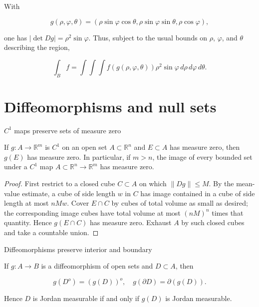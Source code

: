 \begin{example}

With

\[g\left( {\rho,\varphi,\theta} \right) = \left( {\rho\sin\varphi\cos\theta,\rho\sin\varphi\sin\theta,\rho\cos\varphi} \right),\]

one has \(\left| {\det Dg} \right| = \rho^{2}\sin\varphi\). Thus, subject to the usual bounds on \(\rho\), \(\varphi\), and \(\theta\) describing the region,

\[\int_{B}f = \int\int\int f\left( {g\left( {\rho,\varphi,\theta} \right)} \right)\rho^{2}\sin\varphi\, d\rho\, d\varphi\, d\theta.\]

\end{example}

\section{Diffeomorphisms and null sets}

\begin{theorem}{\(C^{1}\) maps preserve sets of measure zero}

If \(g:A\rightarrow\mathbb{R}^{m}\) is \(C^{1}\) on an open set \(A \subset \mathbb{R}^{n}\) and \(E \subset A\) has measure zero, then \(g(E)\) has measure zero. In particular, if \(m > n\), the image of every bounded set under a \(C^{1}\) map \(A \subset \mathbb{R}^{n}\rightarrow\mathbb{R}^{m}\) has measure zero.

\end{theorem}

\begin{proof}

First restrict to a closed cube \(C \subset A\) on which \(\left\| {Dg} \right\| \leq M\). By the mean-value estimate, a cube of side length \(w\) in \(C\) has image contained in a cube of side length at most \(nMw\). Cover \(E \cap C\) by cubes of total volume as small as desired; the corresponding image cubes have total volume at most \(\left( {nM} \right)^{n}\) times that quantity. Hence \(g\left( {E \cap C} \right)\) has measure zero. Exhaust \(A\) by such closed cubes and take a countable union.

\end{proof}

\begin{proposition}{Diffeomorphisms preserve interior and boundary}

If \(g:A\rightarrow B\) is a diffeomorphism of open sets and \(D \subset A\), then

\[g\left( D^{o} \right) = \left( {g(D)} \right)^{o},\quad g\left( {\partial D} \right) = \partial\left( {g(D)} \right).\]

Hence \(D\) is Jordan measurable if and only if \(g(D)\) is Jordan measurable.

\end{proposition}

